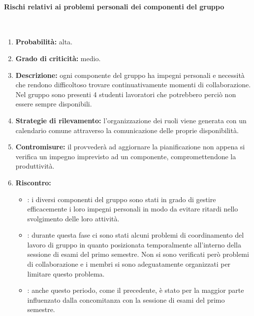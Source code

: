 \paragraph{Rischi relativi ai problemi personali dei componenti del gruppo}\mbox{}\\
\begin{enumerate}
	\item \textbf{Probabilità:} alta.
	\item \textbf{Grado di criticità:} medio.
	\item \textbf{Descrizione:} ogni componente del gruppo ha impegni personali e necessità che rendono difficoltoso trovare continuativamente momenti di collaborazione. Nel gruppo sono presenti 4 studenti lavoratori che potrebbero perciò non essere sempre disponibili.
	\item \textbf{Strategie di rilevamento:} l’organizzazione dei ruoli viene generata con un calendario comune attraverso la comunicazione delle proprie disponibilità.
	\item \textbf{Contromisure:} il \Responsabile{} provvederà ad aggiornare la pianificazione non appena si verifica un impegno imprevisto ad un componente, compromettendone la produttività.
	\item \textbf{Riscontro:}
	\begin{itemize}
		\item \AR: i diversi componenti del gruppo sono stati in grado di gestire efficacemente i loro impegni personali in modo da evitare ritardi nello svolgimento delle loro attività.
		\item \AD: durante questa fase ci sono stati alcuni problemi di coordinamento del lavoro di gruppo in quanto posizionata temporalmente all’interno della sessione di esami del primo semestre. Non si sono verificati però problemi di collaborazione e i membri si sono adeguatamente organizzati per limitare questo problema.
		\item \PA: anche questo periodo, come il precedente, è stato per la maggior parte influenzato dalla concomitanza con la sessione di esami del primo semestre.
	\end{itemize}
\end{enumerate}

